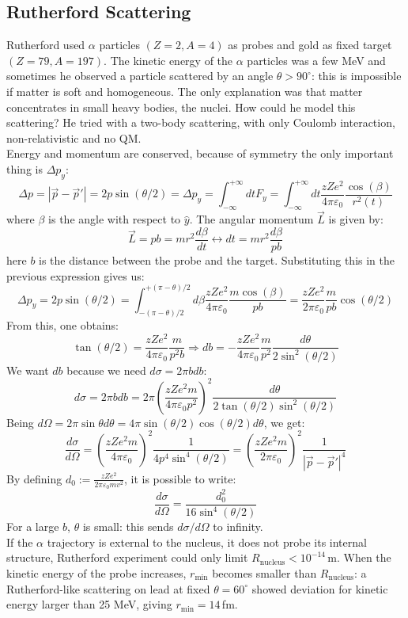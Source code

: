 \documentclass[10.75pt,a4paper,openright,bottom=2cm]{article}
\begin{document}
\subsection{Rutherford Scattering}
Rutherford used $\alpha$ particles $(Z=2,A=4)$ as probes and gold as fixed target $(Z=79, A=197)$. The kinetic energy of the $\alpha$ particles was a few MeV and sometimes he observed a particle scattered by an angle $\theta>90^\circ$: this is impossible if matter is soft and homogeneous. The only explanation was that matter concentrates in small heavy bodies, the nuclei. How could he model this scattering? He tried with a two-body scattering, with only Coulomb interaction, non-relativistic and no QM.\\
Energy and momentum are conserved, because of symmetry the only important thing is $\Delta p_y$:
\[
\Delta p=|\Vec{p}-\Vec{p}'|=2p\sin(\theta/2)=\Delta p_y=\int_{-\infty}^{+\infty}dtF_y=\int_{-\infty}^{+\infty}dt\frac{zZe^2}{4\pi\varepsilon_0}\frac{\cos(\beta)}{r^2(t)}
\]
where $\beta$ is the angle with respect to $\hat{y}$. The angular momentum $\Vec{L}$ is given by:
\[
\Vec{L}=pb=mr^2\frac{d\beta}{dt}\leftrightarrow dt=mr^2\frac{d\beta}{pb}
\]
here $b$ is the distance between the probe and the target. Substituting this in the previous expression gives us:
\[
\Delta p_y=2p\sin(\theta/2)=\int_{-(\pi-\theta)/2}^{+(\pi-\theta)/2}d\beta\frac{zZe^2}{4\pi\varepsilon_0}\frac{m\cos(\beta)}{pb}=\frac{zZe^2}{2\pi\varepsilon_0}\frac{m}{pb}\cos(\theta/2)
\]
From this, one obtains:
\[
\tan(\theta/2)=\frac{zZe^2}{4\pi\varepsilon_0}\frac{m}{p^2b}\Rightarrow db=-\frac{zZe^2}{4\pi\varepsilon_0}\frac{m}{p^2}\frac{d\theta}{2\sin^2(\theta/2)}
\]
We want $db$ because we need $d\sigma=2\pi bdb$:
\[
d\sigma=2\pi bdb=2\pi\left(\frac{zZe^2m}{4\pi\varepsilon_0p^2}\right)^2\frac{d\theta}{2\tan(\theta/2)\sin^2(\theta/2)}
\]
Being $d\Omega=2\pi\sin\theta d\theta=4\pi\sin(\theta/2)\cos(\theta/2)d\theta$, we get:
\[
\frac{d\sigma}{d\Omega}=\left(\frac{zZe^2m}{4\pi\varepsilon_0}\right)^2\frac{1}{4p^4\sin^4(\theta/2)}=\left(\frac{zZe^2m}{2\pi\varepsilon_0}\right)^2\frac{1}{|\Vec{p}-\Vec{p}'|^4}
\]
By defining $d_0:=\frac{zZe^2}{2\pi\varepsilon_0mv^2}$, it is possible to write:
\[
\frac{d\sigma}{d\Omega}=\frac{d_0^2}{16\sin^4(\theta/2)}
\]
For a large $b$, $\theta$ is small: this sends $d\sigma/d\Omega$ to infinity.\\
If the $\alpha$ trajectory is external to the nucleus, it does not probe its internal structure, Rutherford experiment could only limit $R_{\text{nucleus}}<10^{-14}$\,m. When the kinetic energy of the probe increases, $r_{\min}$ becomes smaller than $R_{\text{nucleus}}$: a Rutherford-like scattering on lead at fixed $\theta=60^\circ$ showed deviation for kinetic energy larger than 25 MeV, giving $r_{\min}=14$\,fm.\\
\end{document}
